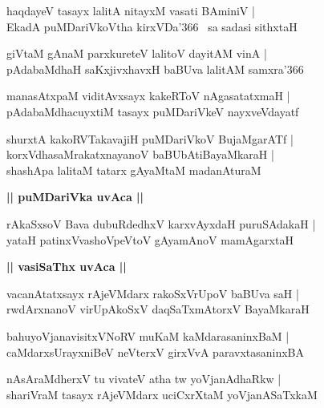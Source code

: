 \documentclass[twoside,12pt,openright]{book}
\newcounter{shloka}[chapter]
\def\uvaca#1{\centerline{{\large\textbf{#1}}}}
\begin{document}
\begin{shloka}%
haqdayeV tasayx lalitA nitayxM vasati BAminiV |\\
EkadA puMDariVkoVtha kirxVDa\char'366 ~sa sadasi sithxtaH 
\end{shloka}

\begin{shloka}%
giVtaM gAnaM parxkureteV lalitoV dayitAM vinA |\\
pAdabaMdhaH saKxjivxhavxH baBUva lalitAM samxra\char'366
\end{shloka}

\begin{shloka}%
manasAtxpaM viditAvxsayx kakeRToV nAgasatatxmaH |\\
pAdabaMdhacuyxtiM tasayx puMDariVkeV nayxveVdayatf
\end{shloka}

\begin{shloka}%
shurxtA kakoRVTakavajiH puMDariVkoV BujaMgarATf |\\
korxVdhasaMrakatxnayanoV baBUbAtiBayaMkaraH |\\
shashApa lalitaM tatarx gAyaMtaM madanAturaM
\end{shloka}

\uvaca{|| puMDariVka uvAca ||}

\begin{shloka}%
rAkaSxsoV Bava dubuRdedhxV karxvAyxdaH puruSAdakaH |\\
yataH patinxVvashoVpeVtoV gAyamAnoV mamAgarxtaH 
\end{shloka}

\uvaca{|| vasiSaThx uvAca ||}

\begin{shloka}%
vacanAtatxsayx rAjeVMdarx rakoSxVrUpoV baBUva saH |\\
rwdArxnanoV virUpAkoSxV daqSaTxmAtorxV BayaMkaraH 
\end{shloka}

\begin{shloka}%
bahuyoVjanavisitxVNoRV muKaM kaMdarasaninxBaM |\\
caMdarxsUrayxniBeV neVterxV girxVvA paravxtasaninxBA
\end{shloka}

\begin{shloka}%
nAsAraMdherxV tu vivateV atha tw yoVjanAdhaRkw |\\
shariVraM tasayx rAjeVMdarx uciCxrXtaM yoVjanASaTxkaM 
\end{shloka}
\end{document}
